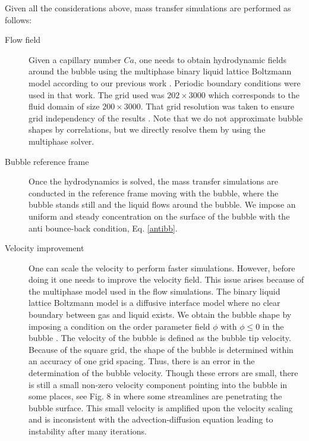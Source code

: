 \documentclass{article}
\begin{document}
Given all the considerations above, mass transfer simulations are performed as follows:
\begin{description}
 \item[Flow field] Given a capillary number $Ca$, one needs to obtain hydrodynamic fields around
the bubble using the multiphase binary liquid lattice Boltzmann model according to our previous work
\cite{kuzmin-binary2d}. Periodic boundary conditions were used in that work. The grid used  was
$202\times 3000$ which corresponds to the fluid domain  of size $200\times3000$. That grid resolution was
taken to ensure grid
independency of the results \cite{kuzmin-binary2d}. Note that we do not approximate bubble shapes by correlations, but we directly resolve them by using the multiphase solver. 
 \item[Bubble reference frame] Once the hydrodynamics is solved, the mass transfer simulations
are conducted in the reference frame moving with the bubble, where the bubble stands still and the liquid
flows around the
bubble. We impose an uniform and steady concentration on the surface
of the bubble with the anti bounce-back condition, Eq. \ref{antibb}.
 \item[Velocity improvement] One can scale the velocity to
perform faster simulations. However, before doing it one needs to improve the velocity field.
This issue arises because of the
multiphase model used in the flow simulations. The binary liquid lattice Boltzmann model is a diffusive
interface model where no clear boundary between gas and liquid exists.
We obtain the bubble shape by imposing a condition on the order parameter field $\phi$ with $\phi\leq0$ in the bubble \cite{kuzmin-binary2d}. The velocity of the
bubble is defined as the bubble tip velocity. Because of the square grid, the shape of the bubble is determined within an accuracy of one grid spacing. Thus,
there is an error in the determination of the bubble velocity. Though these errors are small,
there is still a small non-zero velocity component pointing into the bubble in some places, see Fig. 8 in
\cite{kuzmin-binary2d} where some streamlines are penetrating the bubble surface.
This small velocity is amplified upon the velocity scaling and is inconsistent with the
advection-diffusion equation leading to instability after many iterations.


\end{description}
\end{document}
